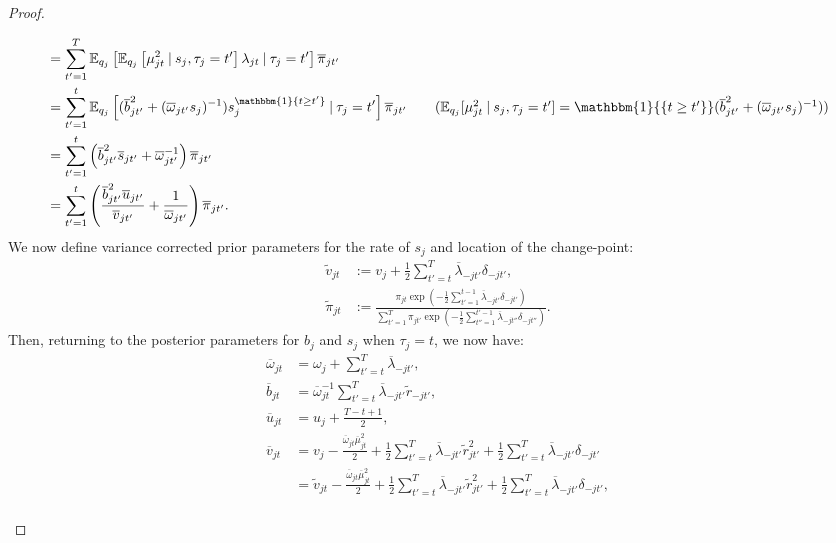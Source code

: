 \begin{proof}
\begin{enumerate}[label=\roman*.]
\begin{align*}
    &= \sum_{t'=1}^T  \E_{q_{j}}\left[\E_{q_{j}}\left[\mu^2_{jt}\:|\: s_{j}, \tau_{j} = t'\right]\lambda_{jt}\:|\: \tau_{j}= t'\right] \overline{\pi}_{jt'} \\
    &= \sum_{t'=1}^t \E_{q_{j}}\left[(\overline{b}_{j t'}^2 + (\overline{\omega}_{j t'}s_{j})^{-1})s_j^{\mathbbm{1}\{t \geq t'\}}\:|\: \tau_j= t'\right] \overline{\pi}_{j t'} \tag{$\E_{q_{j}}[\mu^2_{jt}\:|\: s_j, \tau_j = t'] = \mathbbm{1}{\{t \geq t'\}} (\overline{b}_{jt'}^2 + (\overline{\omega}_{jt'}s_{j})^{-1})$} \\
    &= \sum_{t'=1}^t \left(\overline{b}^2_{jt'}\overline{s}_{jt'} +\overline{\omega}_{jt'}^{-1}\right) \overline{\pi}_{jt'} \\
    &= \sum_{t'=1}^t \left(\frac{\overline{b}^2_{jt'}\overline{u}_{jt'}}{\overline{v}_{jt'}} +\frac{1}{\overline{\omega}_{jt'}}\right) \overline{\pi}_{jt'}.
\end{align*}
\normalsize
We now define variance corrected prior parameters for the rate of $s_{j}$ and location of the change-point:
\begin{align}
    \tilde{v}_{jt} &:= v_j + \frac{1}{2}\sum_{t'=t}^{T}\overline{\lambda}_{-jt'}\delta_{-jt'}, \label{eq:v-j-corrected} \\
    \tilde{\pi}_{jt} &:= \frac{\pi_{jt} \exp\left(-\frac{1}{2}\sum_{t'=1}^{t-1}\overline{\lambda}_{-jt'}\delta_{-jt'}\right)}{\sum_{t'=1}^T \pi_{jt'} \exp\left(-\frac{1}{2}\sum_{t''=1}^{t'-1}\overline{\lambda}_{-jt''}\delta_{-jt''}\right)}. \label{eq:pi-j-corrected}
\end{align}
Then, returning to the posterior parameters for $b_{j}$ and $s_{j}$ when $\tau_{j}=t$, we now have:
\begin{align*}
    \overline{\omega}_{jt} &=  \omega_{j} +  \sum_{t'=t}^{T} \overline{\lambda}_{-jt'}, \\
    \overline{b}_{jt}  &= \overline{\omega}_{jt}^{-1}  \sum_{t'=t}^{T} \overline{\lambda}_{-jt'}\tilde{r}_{-j t'},\\
    \overline{u}_{jt} &= u_{j} + \frac{T-t+1}{2}, \\
    \overline{v}_{jt} &= v_{j} - \frac{\overline{\omega}_{jt}\overline{\mu}^2_{jt}}{2} + \frac{1}{2}\sum_{t'=t}^{T}\overline{\lambda}_{-jt'}\tilde{r}^2_{jt'} + \frac{1}{2}\sum_{t'=t}^{T}\overline{\lambda}_{-jt'}\delta_{-jt'} \\
    &= \tilde{v}_{jt} - \frac{\overline{\omega}_{jt}\overline{\mu}^2_{jt}}{2} + \frac{1}{2}\sum_{t'=t}^{T}\overline{\lambda}_{-jt'}\tilde{r}^2_{jt'} + \frac{1}{2}\sum_{t'=t}^{T}\overline{\lambda}_{-jt'}\delta_{-jt'}, \\

\end{align*}
\end{enumerate}
\end{proof}
